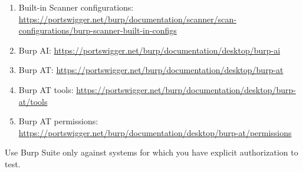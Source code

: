 \documentclass[11pt]{article}
\begin{document}
\begin{enumerate}
  \item Built-in Scanner configurations: \url{https://portswigger.net/burp/documentation/scanner/scan-configurations/burp-scanner-built-in-configs}
  \item Burp AI: \url{https://portswigger.net/burp/documentation/desktop/burp-ai}
  \item Burp AT: \url{https://portswigger.net/burp/documentation/desktop/burp-at}
  \item Burp AT tools: \url{https://portswigger.net/burp/documentation/desktop/burp-at/tools}
  \item Burp AT permissions: \url{https://portswigger.net/burp/documentation/desktop/burp-at/permissions}
\end{enumerate}

\vfill
\begin{center}
  \small\color{muted}
  Use Burp Suite only against systems for which you have explicit authorization to test.
\end{center}
\end{document}
